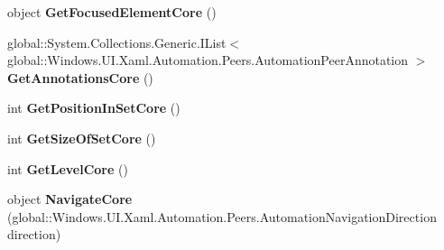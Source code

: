 \begin{DoxyCompactItemize}
\mbox{\label{interface_windows_1_1_u_i_1_1_xaml_1_1_automation_1_1_peers_1_1_i_automation_peer_overrides3_a85c5473c92efce557199ce1f32af01fc}} 
object {\bfseries Get\+Focused\+Element\+Core} ()
\item 
\mbox{\label{interface_windows_1_1_u_i_1_1_xaml_1_1_automation_1_1_peers_1_1_i_automation_peer_overrides3_aa6a79c57927a7424350ddd2c262d71c2}} 
global\+::\+System.\+Collections.\+Generic.\+I\+List$<$ global\+::\+Windows.\+U\+I.\+Xaml.\+Automation.\+Peers.\+Automation\+Peer\+Annotation $>$ {\bfseries Get\+Annotations\+Core} ()
\item 
\mbox{\label{interface_windows_1_1_u_i_1_1_xaml_1_1_automation_1_1_peers_1_1_i_automation_peer_overrides3_afef3ad83240660e412bb003fdb94af98}} 
int {\bfseries Get\+Position\+In\+Set\+Core} ()
\item 
\mbox{\label{interface_windows_1_1_u_i_1_1_xaml_1_1_automation_1_1_peers_1_1_i_automation_peer_overrides3_a3ca3266f1f29e7576d6e7037cb4e1d77}} 
int {\bfseries Get\+Size\+Of\+Set\+Core} ()
\item 
\mbox{\label{interface_windows_1_1_u_i_1_1_xaml_1_1_automation_1_1_peers_1_1_i_automation_peer_overrides3_a52902ce9fb7640616f2937232f64cb71}} 
int {\bfseries Get\+Level\+Core} ()
\item 
\mbox{\label{interface_windows_1_1_u_i_1_1_xaml_1_1_automation_1_1_peers_1_1_i_automation_peer_overrides3_ab89d7e1926fed035b4d1e4a6ebd84e6a}} 
object {\bfseries Navigate\+Core} (global\+::\+Windows.\+U\+I.\+Xaml.\+Automation.\+Peers.\+Automation\+Navigation\+Direction direction)
\item 
\mbox{\label{interface_windows_1_1_u_i_1_1_xaml_1_1_automation_1_1_peers_1_1_i_automation_peer_overrides3_a22a573b6a3dbcdc3cda6486e9dffb748}} 

\end{DoxyCompactItemize}
